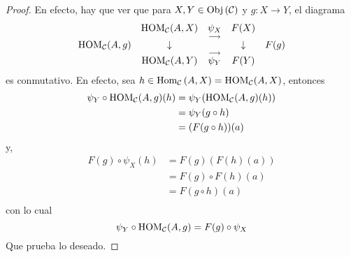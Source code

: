 \documentclass[12pt]{report}
\theoremstyle{largebreak}
\newcommand\cf[3]{\ensuremath{#1:#2\rightarrow#3}}
\newcommand{\Obj}[1]{\ensuremath{\textup{Obj}\left(#1\right)}}
\newcommand{\Hom}[3]{\ensuremath{\textup{Hom}_{#1}\left(#2,#3\right)}}
\begin{document}
\begin{proof}
        En efecto, hay que ver que para $X,Y\in\Obj{\mathcal{C}}$ y $\cf{g}{X}{Y}$, el diagrama
        \begin{equation*}
            \begin{array}{rcccl}
                & \textup{HOM}_{\mathcal{C}}(A,X) & \underset{\longrightarrow}{\psi_{X}} & F(X) &\\
                \textup{HOM}_{\mathcal{C}}(A,g) & \downarrow & & \downarrow & F(g) \\
                & \textup{HOM}_{\mathcal{C}}(A,Y) & \overset{\longrightarrow}{\psi_{Y}} & F(Y) &\\
            \end{array}
        \end{equation*}
        es conmutativo. En efecto, sea $h\in\Hom{\mathcal{C}}{A}{X}=\HOM{\mathcal{C}}(A,X)$, entonces
        \begin{equation*}
            \begin{split}
                \psi_Y\circ \textup{HOM}_{\mathcal{C}}(A,g)(h)&=\psi_Y(\textup{HOM}_{\mathcal{C}}(A,g)(h))\\
                &=\psi_Y(g\circ h)\\
                &=(F(g\circ h))(a)\\
            \end{split}
        \end{equation*}
        y,
        \begin{equation*}
            \begin{split}
                F(g)\circ\psi_X(h)&=F(g)(F(h)(a))\\
                &=F(g)\circ F(h)(a)\\
                &=F(g\circ h)(a)\\
            \end{split}
        \end{equation*}
        con lo cual
        \begin{equation*}
            \psi_Y\circ \textup{HOM}_{\mathcal{C}}(A,g)=F(g)\circ\psi_X
        \end{equation*}
        Que prueba lo deseado.
    \end{proof}
\end{document}
